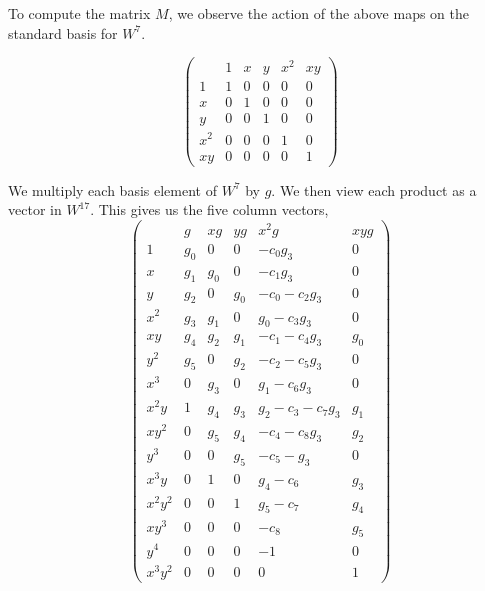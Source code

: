 To compute the matrix $M$, we observe the action of the above maps on the standard basis for $W^7$.

\[ \left( \begin{array}{r|rrrrr}
      & 1 & x & y & x^2 & xy \\
  \hline
    1 & 1 & 0 & 0 & 0 & 0 \\
    x & 0 & 1 & 0 & 0 & 0 \\
    y & 0 & 0 & 1 & 0 & 0 \\
  x^2 & 0 & 0 & 0 & 1 & 0 \\
   xy & 0 & 0 & 0 & 0 & 1
\end{array} \right) \]

We multiply each basis element of $W^7$ by $g$.
We then view each product as a vector in $W^{17}$.
This gives us the five column vectors, 
\[ \left( \begin{array}{r|rrrrr}
         &   g & xg & yg & x^2g & xyg \\
  \hline
  1      & g_0 &   0 &   0 &           - c_0g_3 &   0 \\
  x      & g_1 & g_0 &   0 &           - c_1g_3 &   0 \\
     y   & g_2 &   0 & g_0 &     - c_0 - c_2g_3 &   0 \\
  x^2    & g_3 & g_1 &   0 & g_0       - c_3g_3 &   0 \\
  x  y   & g_4 & g_2 & g_1 &     - c_1 - c_4g_3 & g_0 \\
     y^2 & g_5 &   0 & g_2 &     - c_2 - c_5g_3 &   0 \\
  x^3    &   0 & g_3 &   0 & g_1       - c_6g_3 &   0 \\
  x^2y   &   1 & g_4 & g_3 & g_2 - c_3 - c_7g_3 & g_1 \\
  x  y^2 &   0 & g_5 & g_4 &     - c_4 - c_8g_3 & g_2 \\
     y^3 &   0 &   0 & g_5 &     - c_5    - g_3 &   0 \\
  x^3y   &   0 &   1 &   0 & g_4 - c_6          & g_3 \\ 
  x^2y^2 &   0 &   0 &   1 & g_5 - c_7          & g_4 \\ 
  x  y^3 &   0 &   0 &   0 &     - c_8          & g_5 \\
     y^4 &   0 &   0 &   0 &       - 1          &   0 \\
  x^3y^2 &   0 &   0 &   0 &         0          &   1
\end{array} \right) \]

